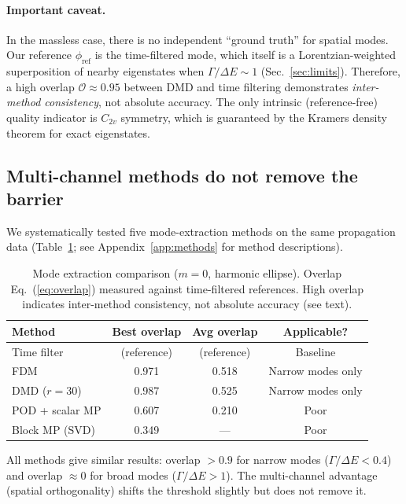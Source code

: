 \documentclass[11pt,a4paper]{article}
\begin{document}
\paragraph{Important caveat.}
In the massless case, there is no independent ``ground truth'' for
spatial modes.  Our reference $\phi_\text{ref}$ is the time-filtered
mode, which itself is a Lorentzian-weighted superposition of nearby
eigenstates when $\Gamma/\Delta E \sim 1$ (Sec.~\ref{sec:limits}).
Therefore, a high overlap $\mathcal{O} \approx 0.95$ between DMD and
time filtering demonstrates \emph{inter-method consistency}, not
absolute accuracy.  The only intrinsic (reference-free) quality
indicator is $C_{2v}$ symmetry, which is guaranteed by the Kramers
density theorem for exact eigenstates.

\subsection{Multi-channel methods do not remove the barrier}

We systematically tested five mode-extraction methods on the same
propagation data (Table~\ref{tab:methods}; see Appendix~\ref{app:methods}
for method descriptions).

\begin{table}[h]
\centering
\caption{Mode extraction comparison ($m = 0$, harmonic ellipse).
Overlap Eq.~(\ref{eq:overlap}) measured against time-filtered references.
High overlap indicates inter-method consistency, not absolute accuracy
(see text).}
\label{tab:methods}
\begin{tabular}{lccc}
\toprule
Method & Best overlap & Avg overlap & Applicable? \\
\midrule
Time filter & (reference) & (reference) & Baseline \\
FDM & 0.971 & 0.518 & Narrow modes only \\
DMD ($r=30$) & 0.987 & 0.525 & Narrow modes only \\
POD + scalar MP & 0.607 & 0.210 & Poor \\
Block MP (SVD) & 0.349 & --- & Poor \\
\bottomrule
\end{tabular}
\end{table}

All methods give similar results: overlap $> 0.9$ for narrow modes
($\Gamma/\Delta E < 0.4$) and overlap $\approx 0$ for broad modes
($\Gamma/\Delta E > 1$).  The multi-channel advantage (spatial
orthogonality) shifts the threshold slightly but does not remove it.
\end{document}
